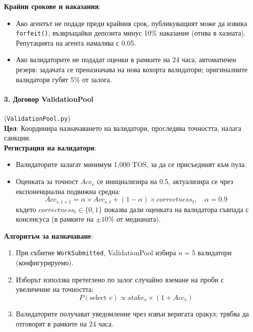\documentclass[11pt]{article}
\begin{document}
\textbf{Крайни срокове и наказания}:
\begin{itemize}[noitemsep]
  \item Ако агентът не подаде преди крайния срок, публикуващият може да извика \texttt{forfeit()}, възвръщайки депозита минус 10\% наказание (отива в хазната). Репутацията на агента намалява с 0.05.
  \item Ако валидаторите не подадат оценки в рамките на 24 часа, автоматичен резерв: задачата се преназначава на нова кохорта валидатори; оригиналните валидатори губят 5\% от залога.
\end{itemize}

\paragraph{3. Договор ValidationPool} (\texttt{ValidationPool.py})\\
\textbf{Цел}: Координира назначаването на валидатори, проследява точността, налага санкции.\\
\textbf{Регистрация на валидатори}:
\begin{itemize}[noitemsep]
  \item Валидаторите залагат минимум 1,000 TOS, за да се присъединят към пула.
  \item Оценката за точност $Acc_v$ се инициализира на 0.5, актуализира се чрез експоненциална подвижна средна:
    \begin{equation}
    Acc_{v,t+1} = \alpha \times Acc_{v,t} + (1-\alpha) \times correctness_t, \quad \alpha = 0.9
    \end{equation}
    където $correctness_t \in \{0,1\}$ показва дали оценката на валидатора съвпада с консенсуса (в рамките на $\pm10\%$ от медианата).
\end{itemize}
\textbf{Алгоритъм за назначаване}:
\begin{enumerate}[noitemsep]
  \item При събитие \texttt{WorkSubmitted}, ValidationPool избира $n=5$ валидатори (конфигурируемо).
  \item Изборът използва претеглено по залог случайно вземане на проби с увеличение на точността:
    \begin{equation}
    P(\text{select } v) \propto stake_v \times (1 + Acc_v)
    \end{equation}
  \item Валидаторите получават уведомление чрез извън веригата оракул; трябва да отговорят в рамките на 24 часа.
\end{enumerate}
\end{document}
